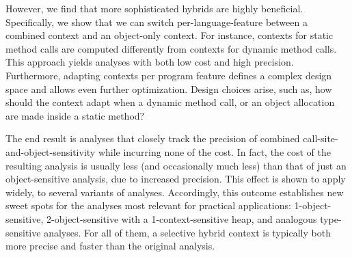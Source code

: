However, we find that more sophisticated hybrids are highly
beneficial. Specifically, we show that we can switch
per-language-feature between a combined context and an object-only
context. For instance, contexts for static method calls are computed
differently from contexts for dynamic method calls. This approach
yields analyses with both low cost and high precision.  Furthermore,
adapting contexts per program feature defines a complex design space
and allows even further optimization. Design choices arise, such as,
how should the context adapt when a dynamic method call, or an object
allocation are made inside a static method?

The end result is analyses that closely track the precision of
combined call-site-and-object-sensitivity while incurring none of the
cost. In fact, the cost of the resulting analysis is usually less
(and occasionally much less) than that of just an object-sensitive
analysis, due to increased precision. This effect is shown to apply
widely, to several variants of analyses. Accordingly, this outcome
establishes new sweet spots for the analyses most relevant for
practical applications: 1-object-sensitive, 2-object-sensitive with a
1-context-sensitive heap, and analogous type-sensitive
\cite{pointsto-popl11} analyses. For all of them, a selective hybrid
context is typically both more precise and faster than the original
analysis. 



